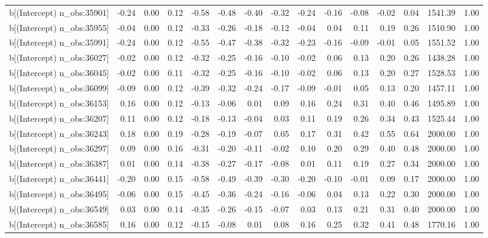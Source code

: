 \begin{table}[ht]
\begin{tabular}{rrrrrrrrrrrrrrr}
  b[(Intercept) n\_obs:35901] & -0.24 & 0.00 & 0.12 & -0.58 & -0.48 & -0.40 & -0.32 & -0.24 & -0.16 & -0.08 & -0.02 & 0.04 & 1541.39 & 1.00 \\ 
  b[(Intercept) n\_obs:35955] & -0.04 & 0.00 & 0.12 & -0.33 & -0.26 & -0.18 & -0.12 & -0.04 & 0.04 & 0.11 & 0.19 & 0.26 & 1510.90 & 1.00 \\ 
  b[(Intercept) n\_obs:35991] & -0.24 & 0.00 & 0.12 & -0.55 & -0.47 & -0.38 & -0.32 & -0.23 & -0.16 & -0.09 & -0.01 & 0.05 & 1551.52 & 1.00 \\ 
  b[(Intercept) n\_obs:36027] & -0.02 & 0.00 & 0.12 & -0.32 & -0.25 & -0.16 & -0.10 & -0.02 & 0.06 & 0.13 & 0.20 & 0.26 & 1438.28 & 1.00 \\ 
  b[(Intercept) n\_obs:36045] & -0.02 & 0.00 & 0.11 & -0.32 & -0.25 & -0.16 & -0.10 & -0.02 & 0.06 & 0.13 & 0.20 & 0.27 & 1528.53 & 1.00 \\ 
  b[(Intercept) n\_obs:36099] & -0.09 & 0.00 & 0.12 & -0.39 & -0.32 & -0.24 & -0.17 & -0.09 & -0.01 & 0.05 & 0.13 & 0.20 & 1457.11 & 1.00 \\ 
  b[(Intercept) n\_obs:36153] & 0.16 & 0.00 & 0.12 & -0.13 & -0.06 & 0.01 & 0.09 & 0.16 & 0.24 & 0.31 & 0.40 & 0.46 & 1495.89 & 1.00 \\ 
  b[(Intercept) n\_obs:36207] & 0.11 & 0.00 & 0.12 & -0.18 & -0.13 & -0.04 & 0.03 & 0.11 & 0.19 & 0.26 & 0.34 & 0.43 & 1525.44 & 1.00 \\ 
  b[(Intercept) n\_obs:36243] & 0.18 & 0.00 & 0.19 & -0.28 & -0.19 & -0.07 & 0.05 & 0.17 & 0.31 & 0.42 & 0.55 & 0.64 & 2000.00 & 1.00 \\ 
  b[(Intercept) n\_obs:36297] & 0.09 & 0.00 & 0.16 & -0.31 & -0.20 & -0.11 & -0.02 & 0.10 & 0.20 & 0.29 & 0.40 & 0.48 & 2000.00 & 1.00 \\ 
  b[(Intercept) n\_obs:36387] & 0.01 & 0.00 & 0.14 & -0.38 & -0.27 & -0.17 & -0.08 & 0.01 & 0.11 & 0.19 & 0.27 & 0.34 & 2000.00 & 1.00 \\ 
  b[(Intercept) n\_obs:36441] & -0.20 & 0.00 & 0.15 & -0.58 & -0.49 & -0.39 & -0.30 & -0.20 & -0.10 & -0.01 & 0.09 & 0.17 & 2000.00 & 1.00 \\ 
  b[(Intercept) n\_obs:36495] & -0.06 & 0.00 & 0.15 & -0.45 & -0.36 & -0.24 & -0.16 & -0.06 & 0.04 & 0.13 & 0.22 & 0.30 & 2000.00 & 1.00 \\ 
  b[(Intercept) n\_obs:36549] & 0.03 & 0.00 & 0.14 & -0.35 & -0.26 & -0.15 & -0.07 & 0.03 & 0.13 & 0.21 & 0.31 & 0.40 & 2000.00 & 1.00 \\ 
  b[(Intercept) n\_obs:36585] & 0.16 & 0.00 & 0.12 & -0.15 & -0.08 & 0.01 & 0.08 & 0.16 & 0.25 & 0.32 & 0.41 & 0.48 & 1770.16 & 1.00 \\ 

\end{tabular}
\end{table}
